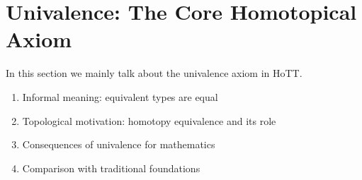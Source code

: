 \section{Univalence: The Core Homotopical Axiom}\label{sec:univalence}

In this section we mainly talk about the univalence axiom in HoTT.

\begin{enumerate}
    \item Informal meaning: equivalent types are equal
    \item Topological motivation: homotopy equivalence and its role
    \item Consequences of univalence for mathematics
    \item Comparison with traditional foundations
\end{enumerate}


